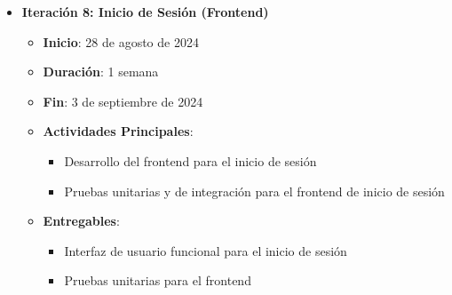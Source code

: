 \begin{itemize}
\begin{itemize}
              \item \textbf{Iteración 8: Inicio de Sesión (Frontend)}
                    \begin{itemize}
                        \item \textbf{Inicio}: 28 de agosto de 2024
                        \item \textbf{Duración}: 1 semana
                        \item \textbf{Fin}: 3 de septiembre de 2024
                        \item \textbf{Actividades Principales}:
                              \begin{itemize}
                                  \item Desarrollo del frontend para el inicio de sesión
                                  \item Pruebas unitarias y de integración para el frontend de inicio de sesión
                              \end{itemize}
                        \item \textbf{Entregables}:
                              \begin{itemize}
                                  \item Interfaz de usuario funcional para el inicio de sesión
                                  \item Pruebas unitarias para el frontend
                              \end{itemize}
                    \end{itemize}


\end{itemize}
\end{itemize}
